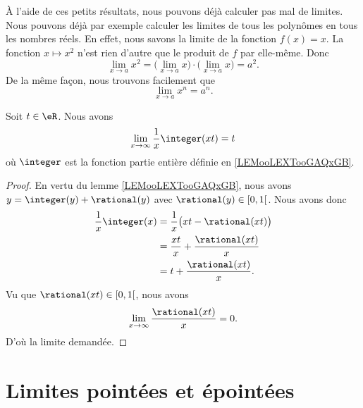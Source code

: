 À l'aide de ces petits résultats, nous pouvons déjà calculer pas mal de limites. Nous pouvons déjà par exemple calculer les limites de tous les polynômes en tous les nombres réels. En effet, nous savons la limite de la fonction $f(x)=x$. La fonction $x\mapsto x^2$ n'est rien d'autre que le produit de $f$ par elle-même. Donc
\[
  \lim_{x\to a}x^2=\big( \lim_{x\to a}x\big)\cdot\big( \lim_{x\to a}x \big)=a^2.
\]
De la même façon, nous trouvons facilement que
\begin{equation}
 \lim_{x\to a}x^n=a^n.
\end{equation}

\begin{lemma}       \label{LEMooLSJZooDauTkc}
    Soit \( t\in \eR\). Nous avons
    \begin{equation}
        \lim_{x\to \infty} \frac{1}{ x }\integer(xt)=t
    \end{equation}
    où \( \integer\) est la fonction partie entière définie en \ref{LEMooLEXTooGAQxGB}.
\end{lemma}

\begin{proof}
    En vertu du lemme \ref{LEMooLEXTooGAQxGB}, nous avons $y=\integer(y)+\rational(y)$ avec \( \rational(y)\in \mathopen[ 0 , 1 \mathclose[\). Nous avons donc
        \begin{subequations}
            \begin{align}
                \frac{1}{ x }\integer(x)&=\frac{1}{ x }\big( xt-\rational(xt) \big)\\
                &=\frac{ xt }{ x }+\frac{ \rational(xt) }{ x }\\
                &=t+\frac{ \rational(xt) }{ x }.
            \end{align}
        \end{subequations}
        Vu que \( \rational(xt)\in \mathopen[ 0 , 1 \mathclose[\), nous avons
            \begin{equation}
                \lim_{x\to \infty} \frac{ \rational(xt) }{ x }=0.
            \end{equation}
        D'où la limite demandée.
\end{proof}

\section{Limites pointées et épointées}
\label{SECooNJSGooGSAtdV}

